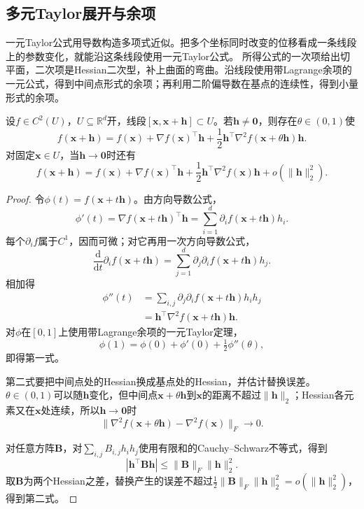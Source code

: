 \subsection{多元Taylor展开与余项}

一元Taylor公式用导数构造多项式近似。把多个坐标同时改变的位移看成一条线段上的参数变化，就能沿这条线段使用一元Taylor公式。
所得公式的一次项给出切平面，二次项是Hessian二次型，补上曲面的弯曲。沿线段使用带Lagrange余项的一元公式，得到中间点形式的余项；再利用二阶偏导数在基点的连续性，得到小量形式的余项。
\begin{theorem}[多元标量函数的二阶Taylor公式]
\label{thm:multivariable-second-order-taylor}
设$f\in C^2(U)$，$U\subseteq\mathbb R^d$开，线段$[\bm x,\bm x+\bm h]\subset U$。若$\bm h\neq\bm 0$，则存在$\theta\in(0,1)$使
\begin{equation}
 f(\bm x+\bm h)=f(\bm x)+\nabla f(\bm x)^\top\bm h
 +\frac12\bm h^\top\nabla^2f(\bm x+\theta\bm h)\bm h.
\label{eq:analysis-second-order-taylor}
\end{equation}
对固定$\bm x\in U$，当$\bm h\to\bm 0$时还有
\begin{equation}
 f(\bm x+\bm h)=f(\bm x)+\nabla f(\bm x)^\top\bm h
 +\frac12\bm h^\top\nabla^2f(\bm x)\bm h+o(\lVert\bm h\rVert_2^2).
\label{eq:analysis-second-order-local-model}
\end{equation}
\end{theorem}
\begin{proof}
令$\phi(t)=f(\bm x+t\bm h)$。由方向导数公式，
\[
 \phi'(t)=\nabla f(\bm x+t\bm h)^\top\bm h=\sum_{i=1}^d\partial_if(\bm x+t\bm h)h_i.
\]
每个$\partial_if$属于$C^1$，因而可微；对它再用一次方向导数公式，
\[
 \frac{\mathrm d}{\mathrm dt}\partial_if(\bm x+t\bm h)=\sum_{j=1}^d\partial_j\partial_if(\bm x+t\bm h)h_j.
\]
相加得
\[
 \begin{aligned}
 \phi''(t)&=\sum_{i,j}\partial_j\partial_if(\bm x+t\bm h)h_ih_j\\
 &=\bm h^\top\nabla^2f(\bm x+t\bm h)\bm h.
 \end{aligned}
\]
对$\phi$在$[0,1]$上使用带Lagrange余项的一元Taylor定理，
\[
 \phi(1)=\phi(0)+\phi'(0)+\tfrac12\phi''(\theta),
\]
即得第一式。

第二式要把中间点处的Hessian换成基点处的Hessian，并估计替换误差。$\theta\in(0,1)$可以随$\bm h$变化，但中间点$\bm x+\theta\bm h$到$\bm x$的距离不超过$\lVert\bm h\rVert_2$；Hessian各元素又在$\bm x$处连续，所以$\bm h\to\bm 0$时
\[
 \lVert\nabla^2f(\bm x+\theta\bm h)-\nabla^2f(\bm x)\rVert_F\to0.
\]

对任意方阵$\bm B$，对$\sum_{i,j}B_{i,j}h_i h_j$使用有限和的Cauchy--Schwarz不等式，得到
\[
 |\bm h^\top\bm B\bm h|\leq\lVert\bm B\rVert_F\lVert\bm h\rVert_2^2.
\]
取$\bm B$为两个Hessian之差，替换产生的误差不超过$\tfrac12\lVert\bm B\rVert_F\lVert\bm h\rVert_2^2=o(\lVert\bm h\rVert_2^2)$，得到第二式。
\end{proof}

